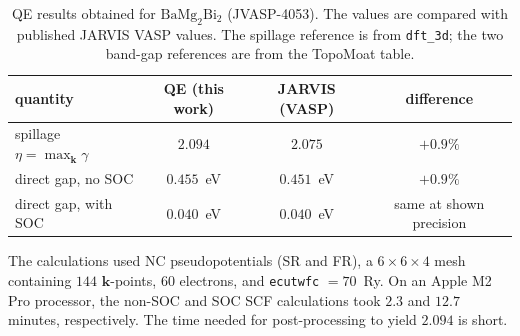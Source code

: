 \documentclass[11pt]{article}
\newcommand{\kk}{\mathbf{k}}
\newcommand{\bmb}{\mathrm{BaMg_2Bi_2}}
\begin{document}
\begin{table}[htbp]
\centering
\caption{QE results obtained for $\bmb$ (JVASP-4053). The values are compared with published JARVIS
VASP values. The spillage reference is from \texttt{dft\_3d}; the two band-gap references are from
the TopoMoat table.}\label{tab:result}
\begin{tabular}{@{}lccc@{}}
\toprule
quantity & QE (this work) & JARVIS (VASP) & difference \\
\midrule
spillage $\eta=\max_\kk\gamma$ & $\mathbf{2.094}$ & $2.075$ & $+0.9\%$ \\
direct gap, no SOC & $0.455$~eV & $0.451$~eV & $+0.9\%$ \\
direct gap, with SOC & $0.040$~eV & $0.040$~eV & same at shown precision \\
\bottomrule
\end{tabular}
\end{table}

\noindent The calculations used NC pseudopotentials (SR and FR), a $6\times6\times4$ mesh containing
$144$ $\kk$-points, $60$ electrons, and \texttt{ecutwfc} $=70$~Ry. On an Apple M2 Pro processor, the
non-SOC and SOC SCF calculations took $2.3$ and $12.7$ minutes, respectively. The time needed for
post-processing to yield $2.094$ is short.
\end{document}
